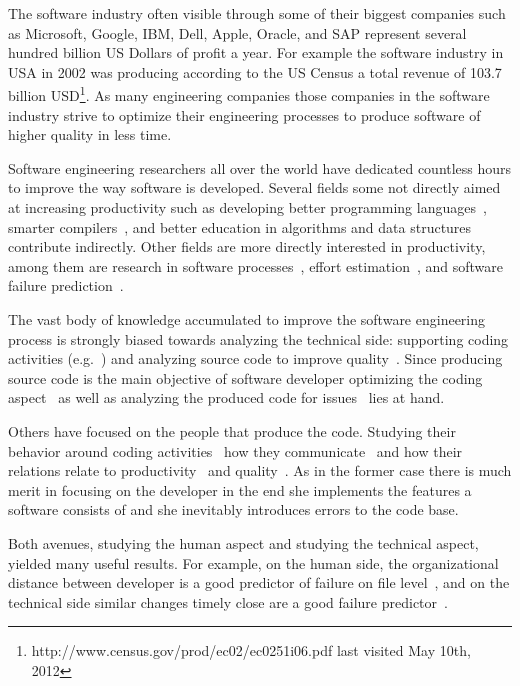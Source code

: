 The software industry often visible through some of their biggest companies such as Microsoft, Google, IBM, Dell, Apple, Oracle, and SAP represent several hundred billion US Dollars of profit a year. 
For example the software industry in USA in 2002 was producing according to the US Census a total revenue of 103.7 billion USD\footnote{http://www.census.gov/prod/ec02/ec0251i06.pdf last visited May 10th, 2012}.
As many engineering companies those companies in the software industry strive to optimize their engineering processes to produce software of higher quality in less time.

Software engineering researchers all over the world have dedicated countless hours to improve the way software is developed.
Several fields some not directly aimed at increasing productivity such as developing better programming languages~\cite{conf:prog:lang}, smarter compilers~\cite{cong:comp:constr}, and better education in algorithms and data structures~\cite{conf:sigcse} contribute indirectly.
Other fields are more directly interested in productivity, among them are research in software processes~\cite{conf:icssp}, effort estimation~\cite{molkken:isese:2003,boehm:analse:2000}, and software failure prediction~\cite{conf:promise}.

The vast body of knowledge accumulated to improve the software engineering process is strongly biased towards analyzing the technical side: supporting coding activities (e.g.~\cite{bassil:iwpc:2001,mens:tse:2004}) and analyzing source code to improve quality~\cite{zimmermann:oopsla:2005,nagappan:icse:2006}. 
Since producing source code is the main objective of software developer optimizing the coding aspect~\cite{bassil:iwpc:2001,mens:tse:2004} as well as analyzing the produced code for issues~\cite{nagappan:icse:2005,schroeter:isese:2006} lies at hand.

Others have focused on the people that produce the code. Studying their behavior around coding activities~\cite{latoza:icse:2006} how they communicate~\cite{ko:icse:2007,gopal:2002:comacm} and how their relations relate to productivity~\cite{gopal:2002:comacm} and quality~\cite{abreu:iwpse:2009,wolf:icse:2009}.
As in the former case there is much merit in focusing on the developer in the end she implements the features a software consists of and she inevitably introduces errors to the code base.

Both avenues, studying the human aspect and studying the technical aspect, yielded many useful results.
For example, on the human side, the organizational distance between developer is a good predictor of failure on file level~\cite{nagappan:icse:2008}, and on the technical side similar changes timely close are a good failure predictor~\cite{kim:icse:2007}.


